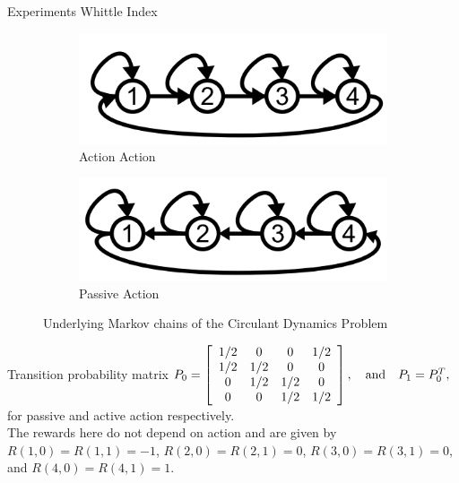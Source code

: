 \documentclass{beamer}
\begin{document}
\begin{frame}{Experiments}
Whittle Index
\begin{figure}[H]
     \captionsetup[subfigure]{justification=centering}
     \centering
     \begin{subfigure}{0.4\linewidth}
         \centering
         \includegraphics[width=0.7\linewidth]{circac.png}
         \caption{Action Action}
         \label{}
     \end{subfigure}
     \begin{subfigure}{0.4\linewidth}
         \centering
         \includegraphics[width=0.7\linewidth]{circpas.png}
         \caption{Passive Action}
         \label{}
     \end{subfigure}
     \caption{Underlying Markov chains of the Circulant Dynamics Problem}
     \label{Circulant Dynamics}
\end{figure}
Transition probability matrix $P_0=\left[\begin{array}{cccc}
{\small 1/2} & 0 & 0 & 1/2\\
1/2 & 1/2 & 0 & 0\\
0 & 1/2 & 1/2 & 0\\
0 & 0 & 1/2 & 1/2
\end{array}\right], \quad \mbox{and} \quad
P_1=P_0^T,$ for passive and active action respectively. \\The rewards here do not depend on action and are given by $R(1,0)=R(1,1)=-1$, $R(2,0)=R(2,1)=0$, $R(3,0)=R(3,1)=0$, and $R(4,0)=R(4,1)=1$.
\end{frame}
\end{document}
